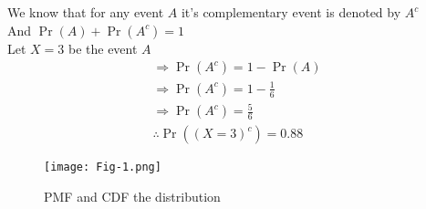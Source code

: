 \documentclass[twocolumn,12pt]{article}
\providecommand{\pr}[1]{\ensuremath{\Pr\left(#1\right)}}
\begin{document}
We know that for any event $A$ it's complementary event is denoted by $A^{c}$\\
And $\pr{A} + \pr{A^{c}} = 1 $ \\
Let $X=3$ be the event $A$ \\
\begin{align}
\Rightarrow \pr{A^{c}}  = 1 - \pr{A} \\
\Rightarrow \pr{A^{c}}  = 1 - \frac{1}{6} \\
\Rightarrow \pr{A^{c}}  = \frac{5}{6} \\
\therefore \pr{(X=3)^{c}} = 0.88
\end{align}
\begin{figure}[h]
\texttt{[image: Fig-1.png]}
\caption{PMF and CDF the distribution}
\label{Fig 1}
\end{figure}
\end{document}
